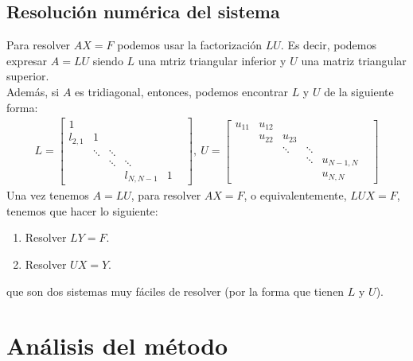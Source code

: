 \subsection{Resolución numérica del sistema}
\noindent Para resolver $AX = F$ podemos usar la factorización $LU$. Es decir, podemos expresar $A = LU$ siendo $L$ una mtriz triangular inferior y $U$ una matriz triangular superior.
\\
\newline
Además, si $A$ es tridiagonal, entonces, podemos encontrar $L$ y $U$ de la siguiente forma:
\begin{align*}
    L = \begin{bmatrix}
    1 &  &  &  & \\
    l_{2,1} & 1 &  &  & \\
    & \ddots & \ddots &  & \\
    & & \ddots & \ddots & & \\
    &  &  & l_{N,N-1} & 1
\end{bmatrix}, \ U  = \begin{bmatrix}
    u_{11} & u_{12}  &  &  & \\
     & u_{22} & u_{23}  &  & \\
    &  & \ddots &  \ddots & \\
    & &  & \ddots &  u_{N-1,N} & \\
    &  &  &  & u_{N,N}
\end{bmatrix}
\end{align*}
Una vez tenemos $A = LU$, para resolver $AX = F$, o equivalentemente, $LUX = F$, tenemos que hacer lo siguiente:
\begin{enumerate}
    \item Resolver $LY = F$.
    \item Resolver $UX = Y$.
\end{enumerate}
que son dos sistemas muy fáciles de resolver (por la forma que tienen $L$ y $U$).

\section{Análisis del método}

